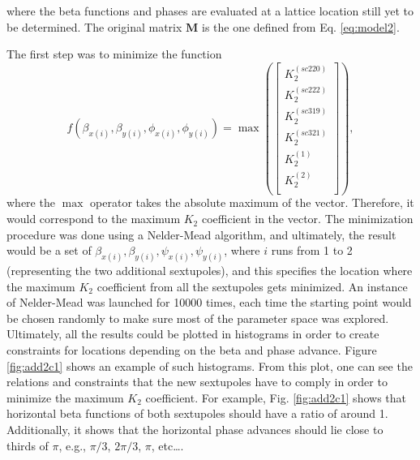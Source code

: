 where the beta functions and phases are evaluated at a lattice location still yet to be determined. The original matrix $\boldsymbol{M}$ is the one defined from Eq. \ref{eq:model2}. 

The first step was to minimize the function
\begin{equation}
    \label{eq:fmax}
    f\left(\beta_{x(i)},\beta_{y(i)}, \phi_{x(i)}, \phi_{y(i)}\right) = \max \left(
    \begin{bmatrix}
    K_2^{(sc220)} \\
    K_2^{(sc222)}\\
    K_2^{(sc319)} \\
    K_2^{(sc321)}\\
    K_2^{(1)} \\
    K_2^{(2)}\\
    \end{bmatrix}
\right),
\end{equation}
where the $\max$ operator takes the absolute maximum of the vector. Therefore, it would correspond to the maximum $K_2$ coefficient in the vector. The minimization procedure was done using a Nelder-Mead algorithm, and ultimately, the result would be a set of $\beta_{x(i)},\beta_{y(i)}, \psi_{x(i)}, \psi_{y(i)}$, where $i$ runs from 1 to 2 (representing the two additional sextupoles), and this specifies the location where the maximum $K_2$ coefficient from all the sextupoles gets minimized. An instance of Nelder-Mead was launched for 10000 times, each time the starting point would be chosen randomly to make sure most of the parameter space was explored. Ultimately, all the results could be plotted in histograms in order to create constraints for locations depending on the beta and phase advance. Figure \ref{fig:add2c1} shows an example of such histograms. From this plot, one can see the relations and constraints that the new sextupoles have to comply in order to minimize the maximum $K_2$ coefficient. For example, Fig. \ref{fig:add2c1} shows that horizontal beta functions of both sextupoles should have a ratio of around 1. Additionally, it shows that the horizontal phase advances should lie close to thirds of $\pi$, e.g., $\pi/3$, $2\pi/3$, $\pi$, etc\dots.

